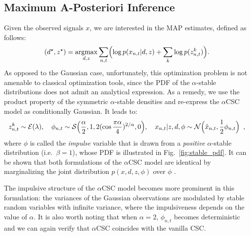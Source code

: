 \subsection{Maximum A-Posteriori Inference}
Given the observed signals $x$, we are interested in the MAP estimates, defined as follows:
\begin{align}
(d^\star,z^\star) = \mathop{\mathrm{argmax}}_{d,z}  \sum_{n,t} \Bigl( \log p(x_{n,t}|d,z) + \sum_k \log p(z_{n,t}^k)  \Bigr).
\end{align}
As opposed to the Gaussian case, unfortunately, this optimization problem is not amenable to classical optimization tools, since the \ac{PDF} of the $\alpha$-stable distributions does not admit an analytical expression.  
%
As a remedy, we use the product property of the symmetric $\alpha$-stable densities \citep{samorodnitsky1994stable,godsill1999bayesian} and re-express the $\alpha$CSC model as conditionally Gaussian. It leads to:
\begin{align}
z_{n,t}^k \sim {\cal E}( \lambda),  \quad 
\phi_{n,t} \sim {\cal S}\Bigl(\frac{\alpha}{2},1, 2 (\cos \frac{\pi \alpha}{4})^{2/\alpha} ,0 \Bigr), \quad
x_{n,t} | z, d, \phi \sim {\cal N}\Bigl(\hat{x}_{n,t},\frac{1}{2}\phi_{n,t} \Bigr) \enspace ,
\label{eqn:sas_condgauss}
\end{align}
where $\phi$ is called the \emph{impulse} variable that is drawn from a \emph{positive} $\alpha$-stable distribution (i.e.\ $\beta =1$), whose \ac{PDF} is illustrated in Fig.~\ref{fig:stable_pdf}. It can be shown that both formulations of the $\alpha$CSC model are identical by marginalizing the joint distribution $p(x,d,z,\phi)$ over $\phi$ \cite[Proposition 1.3.1]{samorodnitsky1994stable}. 

The impulsive structure of the $\alpha$CSC model becomes more prominent in this formulation: the variances of the Gaussian observations are modulated by stable random variables with infinite variance, where the impulsiveness depends on the value of $\alpha$. 
%
It is also worth noting that when $\alpha = 2$, $\phi_{n,t}$ becomes deterministic and we can again verify that $\alpha$CSC coincides with the vanilla \ac{CSC}. 



